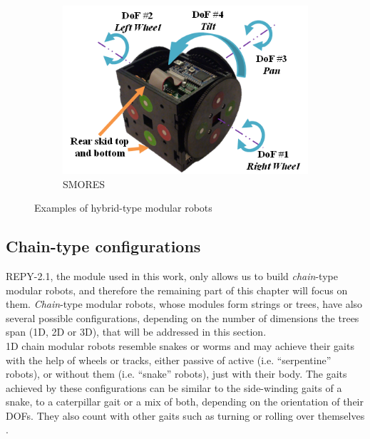 \begin{figure}[h]
\begin{subfigure}[b]{0.28\textwidth}
                \includegraphics[width=\textwidth]{images/SMORES01.png}
                \caption{SMORES}
                \label{fig:SMORES}
        \end{subfigure}
        \caption{Examples of hybrid-type modular robots}\label{fig:config_hybrid_examples}
\end{figure}



\subsection{Chain-type configurations}
\label{config_chain}

REPY-2.1, the module used in this work, only allows us to build \emph{chain}-type modular robots, and therefore the remaining part of this chapter will focus on them. \emph{Chain}-type modular robots, whose modules form strings or trees, have also several possible configurations, depending on the number of dimensions the trees span (1D, 2D or 3D), that will be addressed in this section.\\

1D chain modular robots resemble snakes or worms and may achieve their gaits with the help of  wheels or tracks, either passive of active (i.e. ``serpentine'' robots), or without them (i.e.  ``snake'' robots), just with their body. The gaits achieved by these configurations can be similar to the side-winding gaits of a snake, to a caterpillar gait or a mix of both, depending on the orientation of their DOFs. They also count with other gaits such as turning or rolling over themselves \cite{}.\\

